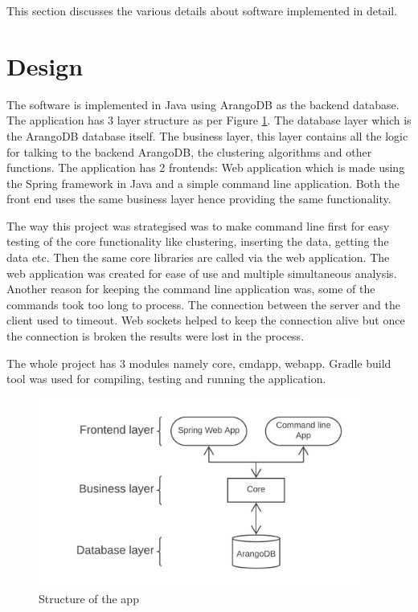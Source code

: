 This section discusses the various details about software implemented in detail.

\section{Design}

The software is implemented in Java using ArangoDB as the backend database. The application has 3 layer structure as per Figure \ref{fig:appdesign}. The database layer which is the ArangoDB database itself. The business layer, this layer contains all the logic for talking to the backend ArangoDB, the clustering algorithms and other functions. The application has 2 frontends: Web application which is made using the Spring framework in Java and a simple command line application. Both the front end uses the same business layer hence providing the same functionality. 

The way this project was strategised was to make command line first for easy testing of the core functionality like clustering, inserting the data, getting the data etc. Then the same core libraries are called via the web application. The web application was created for ease of use and multiple simultaneous analysis. Another reason for keeping the command line application was, some of the commands took too long to process. The connection between the server and the client used to timeout. Web sockets helped to keep the connection alive but once the connection is broken the results were lost in the process.

The whole project has 3 modules namely core, cmdapp, webapp. Gradle build tool was used for compiling, testing and running the application. 

\begin{figure}[ht]
    \centering
    \includegraphics[width=300pt]{appdesign}
    \caption{\label{fig:appdesign} Structure of the app}
\end{figure}

